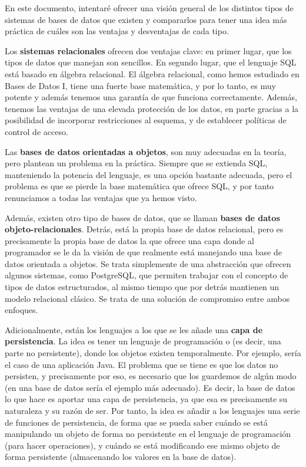 \documentclass[12pt, a4paper]{article}
\title{\size{15pt}{Comparativa de tipos de sistemas de bases de datos} \vspace{-2ex}}
\date{\vspace{-5ex}}
\begin{document}
\maketitle
\thispagestyle{empty}

\vspace{-10ex}

En este documento, intentaré ofrecer una visión general de los distintos tipos de sistemas de bases de datos que existen y compararlos para tener una idea más práctica de cuáles son las ventajas y desventajas de cada tipo.

Los \textbf{sistemas relacionales} ofrecen dos ventajas clave: en primer lugar, que los tipos de datos que manejan son sencillos. En segundo lugar, que el lenguaje SQL está basado en álgebra relacional. El álgebra relacional, como hemos estudiado en Bases de Datos I, tiene una fuerte base matemática, y por lo tanto, es muy potente y además tenemos una garantía de que funciona correctamente. Además, tenemos las ventajas de una elevada protección de los datos, en parte gracias a la posibilidad de incorporar restricciones al esquema, y de establecer políticas de control de acceso.

Las \textbf{bases de datos orientadas a objetos}, son muy adecuadas en la teoría, pero plantean un problema en la práctica. Siempre que se extienda SQL, manteniendo la potencia del lenguaje, es una opción bastante adecuada, pero el problema es que se pierde la base matemática que ofrece SQL, y por tanto renunciamos a todas las ventajas que ya hemos visto.

Además, existen otro tipo de bases de datos, que se llaman \textbf{bases de datos objeto-relacionales}. Detrás, está la propia base de datos relacional, pero es precisamente la propia base de datos la que ofrece una capa donde al programador se le da la visión de que realmente está manejando una base de datos orientada a objetos. Se trata simplemente de una abstracción que ofrecen algunos sistemas, como PostgreSQL, que permiten trabajar con el concepto de tipos de datos estructurados, al mismo tiempo que por detrás mantienen un modelo relacional clásico. Se trata de una solución de compromiso entre ambos enfoques.

Adicionalmente, están los lenguajes a los que se les añade una \textbf{capa de persistencia}. La idea es tener un lenguaje de programación o (es decir, una parte no persistente), donde los objetos existen temporalmente. Por ejemplo, sería el caso de una aplicación Java. El problema que se tiene es que los datos no persisten, y precisamente por eso, es necesario que los guardemos de algún modo (en una base de datos sería el ejemplo más adecuado). Es decir, la base de datos lo que hace es aportar una capa de persistencia, ya que esa es precisamente su naturaleza y su razón de ser. Por tanto, la idea es añadir a los lenguajes una serie de funciones de persistencia, de forma que se pueda saber cuándo se está manipulando un objeto de forma no persistente en el lenguaje de programación (para hacer operaciones), y cuándo se está modificando ese mismo objeto de forma persistente (almacenando los valores en la base de datos).
\end{document}
